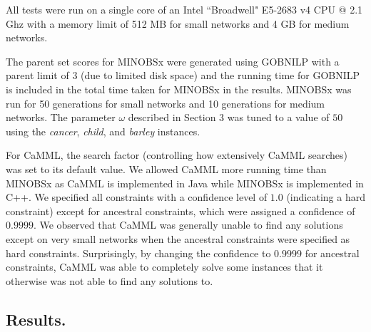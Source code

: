\documentclass[twoside,11pt]{article}
\begin{document}
All tests were run on a single core of an Intel ``Broadwell" E5-2683 v4 CPU @ 2.1 Ghz with a memory limit of 512 MB for small networks and 4 GB for medium networks. 

\medskip
The parent set scores for MINOBSx were generated using GOBNILP with a parent limit of 3 (due to limited disk space) and the running time for GOBNILP is included in 
the total time taken for MINOBSx in the results. MINOBSx was run for 50 generations for small networks and 10 generations for medium networks. The parameter
$\omega$ described in Section 3 was tuned to a value of $50$ using the \emph{cancer}, \emph{child}, and \emph{barley} instances. 

\medskip
For CaMML, the search factor (controlling how extensively CaMML searches) was set to its default value. We allowed CaMML more running time than MINOBSx as CaMML
is implemented in Java while MINOBSx is implemented in C++. We specified all constraints with a confidence level of $1.0$ (indicating a hard constraint) except for ancestral
constraints, which were assigned a confidence of $0.9999$. We observed that CaMML was generally unable to find any solutions except on very small networks when the 
ancestral constraints were specified as hard constraints. Surprisingly, by changing the confidence to $0.9999$ for ancestral constraints, CaMML was able to completely solve
some instances that it otherwise was not able to find any solutions to. 

\subsection{Results.}
\end{document}
